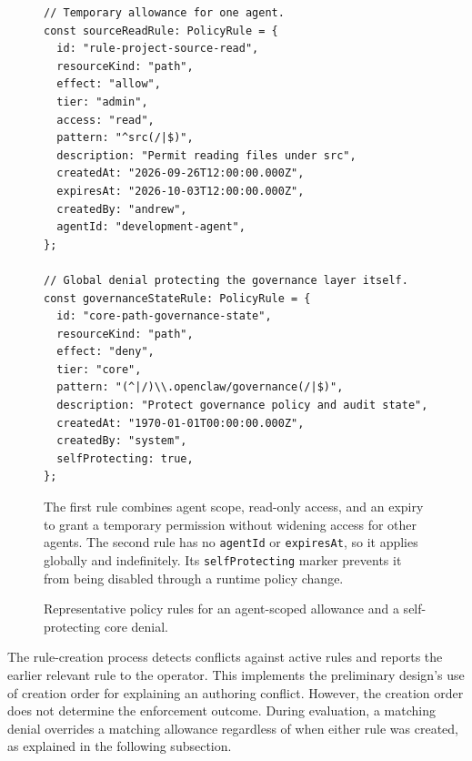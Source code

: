 \begin{figure}[htbp]
\centering
\begin{minipage}{0.96\textwidth}
\begin{reportcodebox}
\begin{lstlisting}[style=reportcode]
// Temporary allowance for one agent.
const sourceReadRule: PolicyRule = {
  id: "rule-project-source-read",
  resourceKind: "path",
  effect: "allow",
  tier: "admin",
  access: "read",
  pattern: "^src(/|$)",
  description: "Permit reading files under src",
  createdAt: "2026-09-26T12:00:00.000Z",
  expiresAt: "2026-10-03T12:00:00.000Z",
  createdBy: "andrew",
  agentId: "development-agent",
};

// Global denial protecting the governance layer itself.
const governanceStateRule: PolicyRule = {
  id: "core-path-governance-state",
  resourceKind: "path",
  effect: "deny",
  tier: "core",
  pattern: "(^|/)\\.openclaw/governance(/|$)",
  description: "Protect governance policy and audit state",
  createdAt: "1970-01-01T00:00:00.000Z",
  createdBy: "system",
  selfProtecting: true,
};
\end{lstlisting}
\end{reportcodebox}
\end{minipage}
\caption{Representative policy rules for an agent-scoped allowance and a
self-protecting core denial.}
\label{fig:gov-code-rule-examples}
\vspace{0.6em}
\begin{minipage}{0.96\textwidth}
{\small
The first rule combines agent scope, read-only access, and an expiry to grant a
temporary permission without widening access for other agents. The second rule
has no \texttt{agentId} or \texttt{expiresAt}, so it applies globally and
indefinitely. Its \texttt{selfProtecting} marker prevents it from being disabled
through a runtime policy change.\par}
\end{minipage}
\end{figure}

The rule-creation process detects conflicts against active rules and reports
the earlier relevant rule to the operator. This implements the preliminary
design's use of creation order for explaining an authoring conflict. However, the creation order does not determine the enforcement outcome. During evaluation,
a matching denial overrides a matching allowance regardless of when either rule
was created, as explained in the following subsection.


